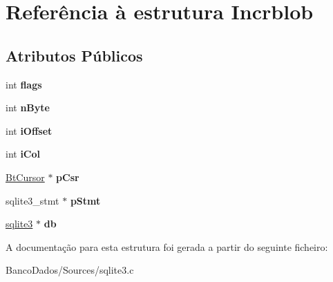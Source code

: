 \hypertarget{struct_incrblob}{\section{Referência à estrutura Incrblob}
\label{struct_incrblob}
}
\subsection*{Atributos Públicos}
\begin{DoxyCompactItemize}
\item 
\hypertarget{struct_incrblob_a46fa093e5241305f28d02926f8d0846f}{int {\bfseries flags}}\label{struct_incrblob_a46fa093e5241305f28d02926f8d0846f}

\item 
\hypertarget{struct_incrblob_ab1e1439df086208173fa97003f0ee02b}{int {\bfseries n\-Byte}}\label{struct_incrblob_ab1e1439df086208173fa97003f0ee02b}

\item 
\hypertarget{struct_incrblob_af8e71744f43178967460b9f402e7fafd}{int {\bfseries i\-Offset}}\label{struct_incrblob_af8e71744f43178967460b9f402e7fafd}

\item 
\hypertarget{struct_incrblob_a398a322b061fb9952bc155026976ba51}{int {\bfseries i\-Col}}\label{struct_incrblob_a398a322b061fb9952bc155026976ba51}

\item 
\hypertarget{struct_incrblob_af5a24b18473d1449c8c3fe7d826de59a}{\hyperlink{struct_bt_cursor}{Bt\-Cursor} $\ast$ {\bfseries p\-Csr}}\label{struct_incrblob_af5a24b18473d1449c8c3fe7d826de59a}

\item 
\hypertarget{struct_incrblob_a8b7b39c9372db552add74c69f14a61a3}{sqlite3\-\_\-stmt $\ast$ {\bfseries p\-Stmt}}\label{struct_incrblob_a8b7b39c9372db552add74c69f14a61a3}

\item 
\hypertarget{struct_incrblob_a9d3fe0b0229b75b9d0f9ee8e6545b5bc}{\hyperlink{structsqlite3}{sqlite3} $\ast$ {\bfseries db}}\label{struct_incrblob_a9d3fe0b0229b75b9d0f9ee8e6545b5bc}

\end{DoxyCompactItemize}


A documentação para esta estrutura foi gerada a partir do seguinte ficheiro\-:\begin{DoxyCompactItemize}
\item 
Banco\-Dados/\-Sources/sqlite3.\-c\end{DoxyCompactItemize}
